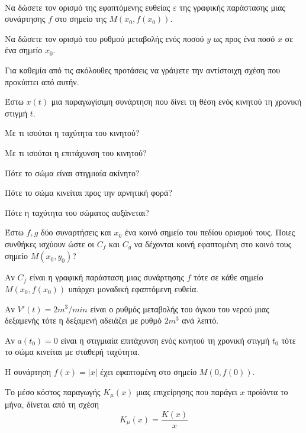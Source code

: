 \documentclass[ektypwsh]{frontisthrio-diag}
\begin{document}
\begin{thema}
\item\mbox{}\\\vspace{-7mm}
\begin{erwthma}
\item Να δώσετε τον ορισμό της εφαπτόμενης ευθείας $ \varepsilon $ της γραφικής παράστασης μιας συνάρτησης  $ f $ στο σημείο της $ M(x_0,f(x_0)) $.
\item Να δώσετε τον ορισμό του ρυθμού μεταβολής ενός ποσού $ y $ ως προς ένα ποσό $ x $ σε ένα σημείο $ x_0 $.
\item Για καθεμία από τις ακόλουθες προτάσεις να γράψετε την αντίστοιχη σχέση που προκύπτει από αυτήν.
\begin{alist}
\item Έστω $ x(t) $ μια παραγωγίσιμη συνάρτηση που δίνει τη θέση ενός κινητού τη χρονική στιγμή $ t $.
\begin{rlist}
\item Με τι ισούται η ταχύτητα του κινητού?
\item Με τι ισούται η επιτάχυνση του κινητού?
\item Πότε το σώμα είναι στιγμιαία ακίνητο?
\item Πότε το σώμα κινείται προς την αρνητική φορά?
\item Πότε η ταχύτητα του σώματος αυξάνεται?
\end{rlist}
\item Έστω $ f,g $ δύο συναρτήσεις και $ x_0 $ ένα κοινό σημείο του πεδίου ορισμού τους. Ποιες συνθήκες ισχύουν ώστε οι $ C_f $ και $ C_g $ να δέχονται κοινή εφαπτομένη στο κοινό τους σημείο $ M(x_0,y_0) $?
\end{alist}
\item \swstolathospan
\begin{alist}
\item Αν $ C_f $ είναι η γραφική παράσταση μιας συνάρτησης $ f $ τότε σε κάθε σημείο $ M(x_0,f(x_0)) $ υπάρχει μοναδική εφαπτόμενη ευθεία.
\item Αν $ V'(t)=2m^3/min $ είναι ο ρυθμός μεταβολής του όγκου του νερού μιας δεξαμενής τότε η δεξαμενή αδειάζει με ρυθμό $ 2m^3 $ ανά λεπτό.
\item Αν $ a(t_0)=0 $ είναι η στιγμιαία επιτάχυνση ενός κινητού τη χρονική στιγμή $ t_0 $ τότε το σώμα κινείται με σταθερή ταχύτητα.
\item Η συνάρτηση $ f(x)=|x| $ έχει εφαπτομένη στο σημείο $ M(0,f(0)) $.
\item Το μέσο κόστος παραγωγής $ K_{\mu}(x) $ μιας επιχείρησης που παράγει $ x $ προϊόντα το μήνα, δίνεται από τη σχέση \[ K_{\mu}(x)=\frac{K(x)}{x} \]

\end{alist}
\end{erwthma}
\end{thema}
\end{document}
